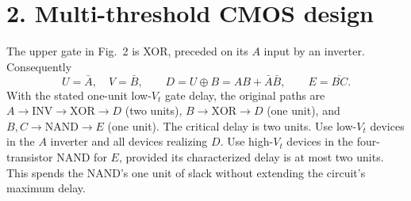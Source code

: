\documentclass[11pt]{article}
\begin{document}
\newpage
\section*{2. Multi-threshold CMOS design}
The upper gate in Fig.~2 is XOR, preceded on its $A$ input by an inverter.
Consequently
\[
 U=\bar A,\quad V=\bar B,\qquad
 \boxed{D=U\oplus B=AB+\bar A\bar B},\qquad
 \boxed{E=\overline{BC}}.
\]
With the stated one-unit low-$V_t$ gate delay, the original paths are
$A\to\mathrm{INV}\to\mathrm{XOR}\to D$ (two units),
$B\to\mathrm{XOR}\to D$ (one unit), and
$B,C\to\mathrm{NAND}\to E$ (one unit). The critical delay is two units.
Use low-$V_t$ devices in the $A$ inverter and all devices realizing $D$.
Use high-$V_t$ devices in the four-transistor NAND for $E$, provided its
characterized delay is at most two units. This spends the NAND's one unit
of slack without extending the circuit's maximum delay.
\end{document}
